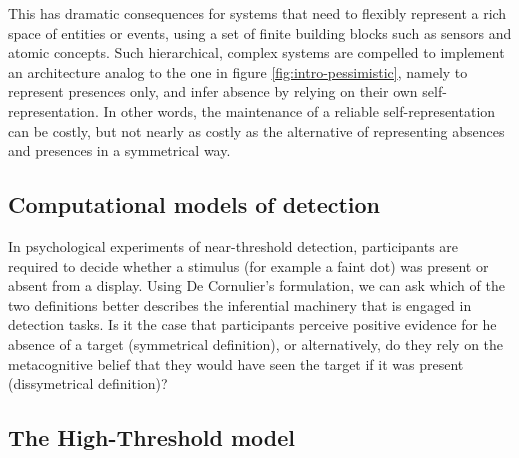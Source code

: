 \documentclass[12pt,twoside]{reedthesis}
\begin{document}
This has dramatic consequences for systems that need to flexibly represent a rich space of entities or events, using a set of finite building blocks such as sensors and atomic concepts. Such hierarchical, complex systems are compelled to implement an architecture analog to the one in figure \ref{fig:intro-pessimistic}, namely to represent presences only, and infer absence by relying on their own self-representation. In other words, the maintenance of a reliable self-representation can be costly, but not nearly as costly as the alternative of representing absences and presences in a symmetrical way.

\hypertarget{detectionmodels}{%
\subsection{Computational models of detection}\label{detectionmodels}}

In psychological experiments of near-threshold detection, participants are required to decide whether a stimulus (for example a faint dot) was present or absent from a display. Using De Cornulier's formulation, we can ask which of the two definitions better describes the inferential machinery that is engaged in detection tasks. Is it the case that participants perceive positive evidence for he absence of a target (symmetrical definition), or alternatively, do they rely on the metacognitive belief that they would have seen the target if it was present (dissymetrical definition)?

\hypertarget{htm}{%
\subsection*{The High-Threshold model}\label{htm}}
\end{document}

